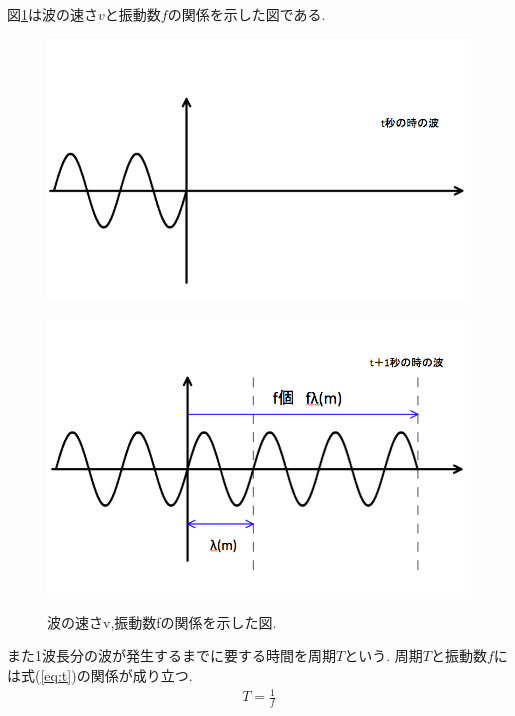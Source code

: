 図\ref{fig:vft}は波の速さ$v$と振動数$f$の関係を示した図である.
\begin{figure}[htbp]
\begin{minipage}[b]{1.0\linewidth}
\centering
\includegraphics[keepaspectratio, scale=0.42]
  {../background/tminute2.png}
 \label{tminute}
 \end{minipage}
 
\begin{minipage}[b]{1.0\linewidth}
\centering
  \includegraphics[keepaspectratio, scale=0.42]
  {../background/t+1minute2.png}
 \label{t+1minute}
 \end{minipage}
  
  \caption{波の速さv,振動数fの関係を示した図.}
 \label{fig:vft}
\end{figure}

また1波長分の波が発生するまでに要する時間を周期$T$という.
周期$T$と振動数$f$には式(\ref{eq:t})の関係が成り立つ.
\begin{eqnarray}
\label{eq:t}
T = \frac{1}{f}
\end{eqnarray}


